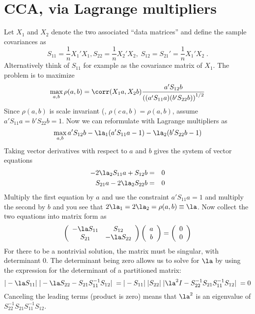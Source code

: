 \documentclass[12pt]{article}
\begin{document}
\section{CCA, via Lagrange multipliers}
\label{sec:ccalag}

 Let $X_1$ and $X_2$ denote the two associated ``data matrices'' and define the
sample covariances as
 \begin{equation}
   S_{11} = \frac{1}{n} X_1'X_1, S_{22} = \frac{1}{n} X_2'X_2,
   \; S_{12} = S_{21}' = \frac{1}{n} X_1'X_2 \;.
 \label{eq:s11}
 \end{equation}
 Alternatively think of $S_{11}$ for example as the covariance matrix of $X_1$.
  The problem is to maximize
 \begin{equation}
    \max_{a,b} \rho(a,b)= \corr(X_1a, X_2b)
               \frac{a'S_{12}b}
                    {\left((a'S_{11}a)(b'S_{22}b)\right)^{1/2}}
 \label{eq:cancor}
 \end{equation}
 Since $\rho(a,b)$ is scale invariant (\ie, $\rho(c\,a,b) = \rho(a,b)$, assume
 $a'S_{11}a = b'S_{22}b = 1$.  Now we can reformulate with Lagrange multipliers
 as
 \begin{equation}
    \max_{a,b} a'S_{12}b - \la_1(a'S_{11}a-1) - \la_2 (b'S_{22}b-1)
 \label{eq:cca}
 \end{equation}
 Taking vector derivatives with respect to $a$ and $b$ gives the system of
 vector equations
 \begin{eqnarray*}
   -2\la_2 S_{11} a + S_{12} b &=& 0  \cr
   S_{21} a - 2\la_2 S_{22} b &=& 0
\end{eqnarray*}
 Multiply the first equation by $a$ and use the constraint $a'S_{11}a = 1$ and multiply the second by $b$ and you see that $ 2 \la_1 = 2 \la_2 = \rho(a,b) \equiv \la$.  Now collect the two equations into matrix form as
 \begin{displaymath}
   \left( \begin{array}{cc}
     -\la S_{11} & S_{12} \cr
            S_{21} & -\la S_{22} 
   \end{array} \right)
   \left( \begin{array}{c}  a \cr b \end{array} \right)
   = 
   \left( \begin{array}{c} 0 \cr 0 \end{array} \right)
 \end{displaymath}
 For there to be a nontrivial solution, the matrix must be singular, with
determinant 0. The determinant being zero allows us to solve for $\la$ by using the expression for the determinant of a partitioned matrix:
 \begin{displaymath}
    |-\la  S_{11}| \; |-\la S_{22} - S_{21}S_{11}^{-1}S_{12}| \;
    = 
    |-S_{11}| \; |S_{22}| \;|\la^2I - S_{22}^{-1}S_{21}S_{11}^{-1}S_{12}| \; = 0
 \end{displaymath}
 Canceling the leading terms (product is zero) means that $\la^2$ is an eigenvalue of 
  $S_{22}^{-1}S_{21}S_{11}^{-1}S_{12}$. 
\end{document}
